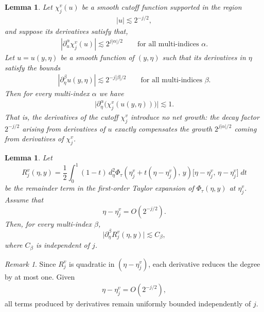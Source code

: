 \documentclass[12pt, reqno]{amsart}
\newtheorem{lemma}[theorem]{Lemma}
\theoremstyle{definition}
\theoremstyle{remark}
\newtheorem{remark}[theorem]{Remark}
\numberwithin{equation}{section}
\begin{document}
\begin{lemma}
Let $\chi_{j}^{v}(u)$ be a smooth cutoff function supported in the region 
\begin{align*}
|u| \lesssim 2^{-j/2},
\end{align*}
and suppose its derivatives satisfy that,
\begin{align*}
|\partial_u^{\alpha}\chi_{j}^{v}(u)| \lesssim 2^{j|\alpha|/2}
\qquad\text{for all multi-indices }\alpha.
\end{align*}
Let $u = u(y,\eta)$ be a smooth function of $(y,\eta)$ such that its derivatives in $\eta$ satisfy the bounds
\begin{align*}
|\partial_{\eta}^{\beta} u(y,\eta)| \lesssim 2^{-j|\beta|/2}
\qquad\text{for all multi-indices }\beta.
\end{align*}
Then for every multi-index $\alpha$ we have
\begin{align*}
\bigl|\partial_{\eta}^{\alpha}\bigl(\chi_{j}^{v}\!\left(u(y,\eta)\right)\bigr)\bigr| \lesssim 1.
\end{align*}
That is, the derivatives of the cutoff $\chi_{j}^{v}$ introduce no net growth: 
the decay factor $2^{-j/2}$ arising from derivatives of $u$ exactly compensates the growth 
$2^{j|\alpha|/2}$ coming from derivatives of $\chi_{j}^{v}$.
\end{lemma}

\begin{lemma}
Let
\[
R_{j}^{v}(\eta,y)
=
\frac12 \int_{0}^{1} (1-t)\,
d_{\eta}^{2}\Phi_{\tau}\!\left(\eta_{j}^{v} + t(\eta-\eta_{j}^{v}),\,y\right)
\bigl[\eta-\eta_{j}^{v},\,\eta-\eta_{j}^{v}\bigr]\; dt
\]
be the remainder term in the first-order Taylor expansion of
$\Phi_{\tau}(\eta,y)$ at $\eta_{j}^{v}$.  
Assume that 
\[
\eta-\eta_{j}^{v}=O(2^{-j/2}).
\]
Then, for every multi-index $\beta$,
\[
\bigl|\partial_{\eta}^{\beta} R_{j}^{v}(\eta,y)\bigr| \lesssim C_{\beta},
\]
where $C_{\beta}$ is independent of $j$. 
\end{lemma}
\begin{remark}
    Since $R_{j}^{v}$ is quadratic in $(\eta - \eta_{j}^{v})$, each derivative 
reduces the degree by at most one.  Given 
\begin{align*}
\eta - \eta_{j}^{v} = O(2^{-j/2}),
\end{align*}
all terms produced by derivatives remain uniformly bounded independently of $j$.
\end{remark}
\end{document}

